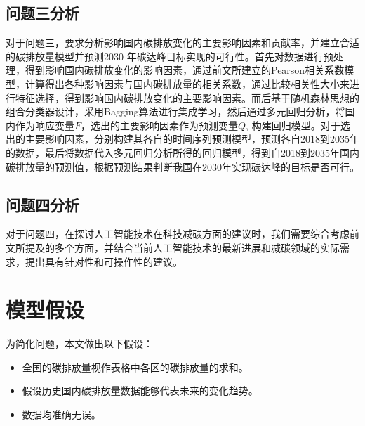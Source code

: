 \documentclass[withoutpreface,bwprint]{cumcmthesis}
\begin{document}
\subsection{问题三分析}
对于问题三，要求分析影响国内碳排放变化的主要影响因素和贡献率，并建立合适的碳排放量模型并预测2030 年碳达峰目标实现的可行性。首先对数据进行预处理，得到影响国内碳排放变化的影响因素，通过前文所建立的Pearson相关系数模型，计算得出各种影响因素与国内碳排放量的相关系数，通过比较相关性大小来进行特征选择，得到影响国内碳排放变化的主要影响因素。而后基于随机森林思想的组合分类器设计，采用Bagging算法进行集成学习，然后通过多元回归分析，将国内作为响应变量$F$，选出的主要影响因素作为预测变量$Q$, 构建回归模型。对于选出的主要影响因素，分别构建其各自的时间序列预测模型，预测各自2018到2035年的数据，最后将数据代入多元回归分析所得的回归模型，得到自2018到2035年国内碳排放量的预测值，根据预测结果判断我国在2030年实现碳达峰的目标是否可行。

\subsection{问题四分析}
对于问题四，在探讨人工智能技术在科技减碳方面的建议时，我们需要综合考虑前文所提及的多个方面，并结合当前人工智能技术的最新进展和减碳领域的实际需求，提出具有针对性和可操作性的建议。


\section{模型假设}

为简化问题，本文做出以下假设：

\begin{itemize}[itemindent=2em]
\item 全国的碳排放量视作表格中各区的碳排放量的求和。
\item 假设历史国内碳排放量数据能够代表未来的变化趋势。
\item 数据均准确无误。
\end{itemize}

\end{document}
